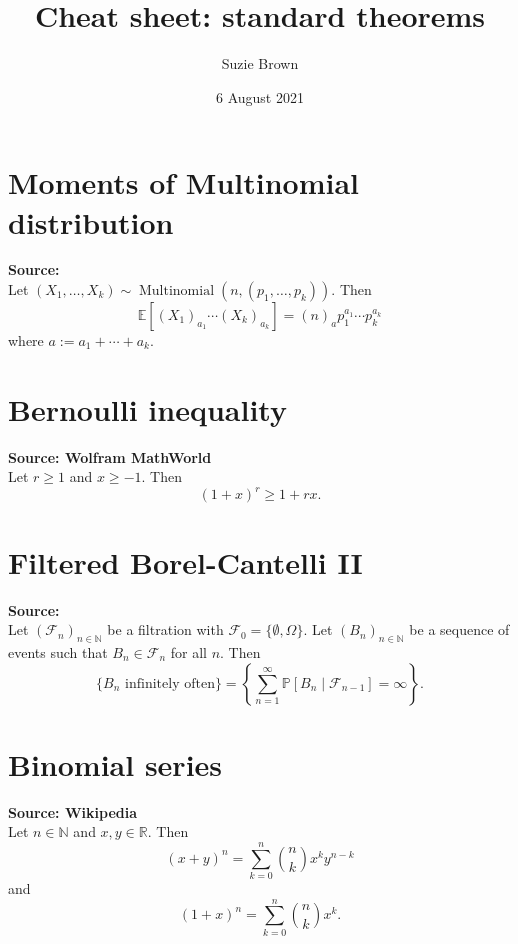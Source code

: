 \documentclass[fleqn]{article}
\title{Cheat sheet: standard theorems}
\author{Suzie Brown}
\date{6 August 2021}
\newcommand{\Prob}{\mathbb{P}}
\newcommand{\E}{\mathbb{E}}
\newcommand{\1}[1]{\mathbb{I}_{#1}}
\newcommand{\Mn}{\operatorname{Multinomial}}
\begin{document}
\maketitle
\thispagestyle{fancy}


\section{Moments of Multinomial distribution}
\textbf{Source: \cite[p.67]{mosimann1962}} \\[10pt]
Let $(X_1, \dots, X_k) \sim \Mn(n, (p_1,\dots, p_k))$.
Then 
\begin{equation*}
\E[ (X_1)_{a_1} \cdots (X_k)_{a_k} ] 
= (n)_a p_1^{a_1} \cdots p_k^{a_k} 
\end{equation*}
where $a := a_1 + \cdots + a_k$.


\section{Bernoulli inequality}
\textbf{Source: Wolfram MathWorld} \\[10pt]
Let $r\geq 1$ and $x \geq -1$.
Then
\begin{equation*}
(1+x)^r \geq 1+rx .
\end{equation*}


\section{Filtered Borel-Cantelli II}
\textbf{Source: \cite[Theorem 4.3.4]{durrett2019}} \\[10pt]
Let $(\mathcal{F}_n)_{n\in\mathbb{N}}$ be a filtration with $\mathcal{F}_0 = \{\emptyset, \Omega\}$. 
Let $(B_n)_{n\in\mathbb{N}}$ be a sequence of events such that $B_n \in \mathcal{F}_n$ for all $n$.
Then
\begin{equation*}
\{ B_n  \text{ infinitely often} \} 
= \left\{ \sum_{n=1}^\infty \Prob[ B_n \mid \mathcal{F}_{n-1} ] = \infty \right\} .
\end{equation*}


\section{Binomial series}
\textbf{Source: Wikipedia} \\[10pt]
Let $n\in\mathbb{N}$ and $x,y \in \mathbb{R}$.
Then
\begin{equation*}
(x+y)^n = \sum_{k=0}^n \binom{n}{k} x^k y^{n-k}
\end{equation*}
and
\begin{equation*}
(1+x)^n = \sum_{k=0}^n \binom{n}{k} x^k .
\end{equation*}
\end{document}
